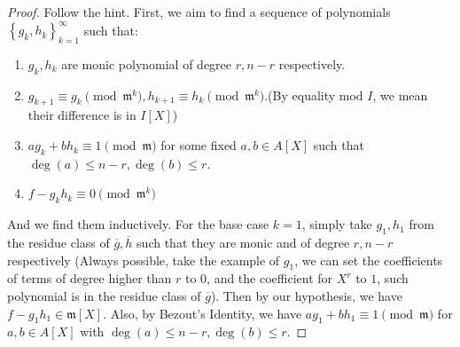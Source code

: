 \documentclass{solution}
\begin{document}
\begin{proof}
    Follow the hint. First, we aim to find a sequence of polynomials $\left\lbrace g_k, h_k \right\rbrace_{k = 1}^{\infty}$ such that:
    \begin{enumerate}
        \item $g_k, h_k$ are monic polynomial of degree $r, n - r$ respectively.
        \item $g_{k + 1} \equiv g_{k} \pmod{\mathfrak{m}^k}, h_{k + 1} \equiv h_{k} \pmod{\mathfrak{m}^k}$.(By equality mod $I$, we mean their difference is in $I[X]$)
        \item $a g_k + bh_k \equiv 1 \pmod {\mathfrak{m}}$ for some fixed $a, b \in A[X]$ such that $\deg(a) \le n - r, \deg(b) \le r$.
        \item $f - g_k h_k \equiv 0 \pmod {\mathfrak{m}^k}$
    \end{enumerate}
    And we find them inductively. For the base case $k = 1$, simply take $g_1, h_1$ from the residue class of $\overline{g}, \overline{h}$ such that they are monic and of degree $r, n - r$ respectively (Always possible, take the example of $g_1$, we can set the coefficients of terms of degree higher than $r$ to $0$, and the coefficient for $X^r$ to $1$, such polynomial is in the residue class of $\overline{g}$). Then by our hypothesis, we have $f - g_1h_1 \in \mathfrak{m}[X]$. Also, by Bezout's Identity, we have $ag_1 + bh_1 \equiv 1 \pmod {\mathfrak{m}}$ for $a, b \in A[X]$ with $\deg(a) \le n - r, \deg(b) \le r$.


\end{proof}
\end{document}
